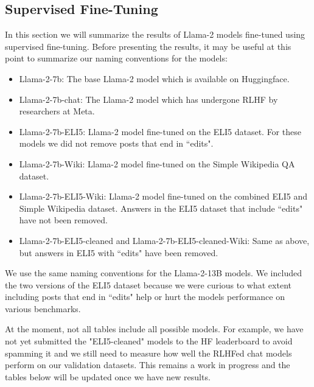 \documentclass[11pt, oneside]{article}   	%
\begin{document}
\subsection{Supervised Fine-Tuning}
In this section we will summarize the results of Llama-2 models fine-tuned using supervised fine-tuning.
Before presenting the results, it may be useful at this point to summarize our naming conventions for the models:
\begin{itemize}
\item Llama-2-7b: The base Llama-2 model which is available on Huggingface.
\item Llama-2-7b-chat: The Llama-2 model which has undergone RLHF by researchers at Meta.
\item Llama-2-7b-ELI5: Llama-2 model fine-tuned on the ELI5 dataset. For these models we did not remove posts that end in ``edits".
\item Llama-2-7b-Wiki: Llama-2 model fine-tuned on the Simple Wikipedia QA dataset.
\item Llama-2-7b-ELI5-Wiki: Llama-2 model fine-tuned on the combined ELI5 and Simple Wikipedia dataset. Answers in the ELI5 dataset that include ``edits" have not been removed.
\item Llama-2-7b-ELI5-cleaned and Llama-2-7b-ELI5-cleaned-Wiki: Same as above, but answers in ELI5 with ``edits" have been removed. 
\end{itemize}
We use the same naming conventions for the Llama-2-13B models. 
We included the two versions of the ELI5 dataset because we were curious to what extent including posts that end in ``edits" help or hurt the models performance on various benchmarks.

At the moment, not all tables include all possible models.
For example, we have not yet submitted the "ELI5-cleaned" models to the HF leaderboard to avoid spamming it and we still need to measure how well the RLHFed chat models perform on our validation datasets.
This remains a work in progress and the tables below will be updated once we have new results.
\end{document}
